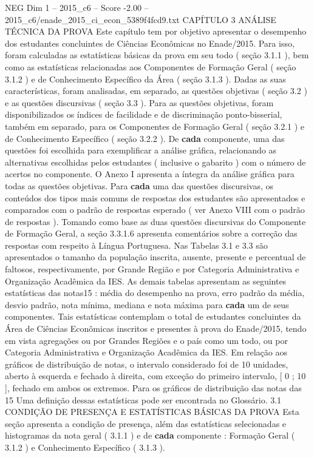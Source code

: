 \begin{textsample}{NEG Dim 1 – 2015\_c6 – Score -2.00 – 2015\_c6/enade\_2015\_ci\_econ\_5389f4fcd9.txt}  \label{ex:f1_neg_284}
CAPÍTULO 3 ANÁLISE TÉCNICA DA PROVA Este capítulo tem por objetivo apresentar o desempenho dos estudantes concluintes de Ciências Econômicas no Enade/2015.
Para isso, foram calculadas as estatísticas básicas da prova em seu todo ( seção 3.1.1 ), bem como as estatísticas relacionadas aos Componentes de Formação Geral ( seção 3.1.2 ) e de Conhecimento Específico da Área ( seção 3.1.3 ).
Dadas as suas características, foram analisadas, em separado, as questões objetivas ( seção 3.2 ) e as questões discursivas ( seção 3.3 ).
Para as questões objetivas, foram disponibilizados os índices de facilidade e de discriminação ponto-bisserial, também em separado, para os Componentes de Formação Geral ( seção 3.2.1 ) e de Conhecimento Específico ( seção 3.2.2 ).
De \textbf{cada} componente, uma das questões foi escolhida para exemplificar a análise gráfica, relacionando as alternativas escolhidas pelos estudantes ( inclusive o gabarito ) com o número de acertos no componente.
O Anexo I apresenta a íntegra da análise gráfica para todas as questões objetivas.
Para \textbf{cada} uma das questões discursivas, os conteúdos dos tipos mais comuns de respostas dos estudantes são apresentados e comparados com o padrão de respostas esperado ( ver Anexo VIII com o padrão de respostas ).
Tomando como base as duas questões discursivas do Componente de Formação Geral, a seção 3.3.1.6 apresenta comentários sobre a correção das respostas com respeito à Língua Portuguesa.
Nas Tabelas 3.1 e 3.3 são apresentados o tamanho da população inscrita, ausente, presente e percentual de faltosos, respectivamente, por Grande Região e por Categoria Administrativa e Organização Acadêmica da IES.
As demais tabelas apresentam as seguintes estatísticas das notas15 : média do desempenho na prova, erro padrão da média, desvio padrão, nota mínima, mediana e nota máxima para \textbf{cada} um de seus componentes.
Tais estatísticas contemplam o total de estudantes concluintes da Área de Ciências Econômicas inscritos e presentes à prova do Enade/2015, tendo em vista agregações ou por Grandes Regiões e o país como um todo, ou por Categoria Administrativa e Organização Acadêmica da IES.
Em relação aos gráficos de distribuição de notas, o intervalo considerado foi de 10 unidades, aberto à esquerda e fechado à direita, com exceção do primeiro intervalo, [ 0 ; 10 ], fechado em ambos os extremos.
Para os gráficos de distribuição das notas das 15 Uma definição dessas estatísticas pode ser encontrada no Glossário. 3.1 CONDIÇÃO DE PRESENÇA E ESTATÍSTICAS BÁSICAS DA PROVA Esta seção apresenta a condição de presença, além das estatísticas selecionadas e histogramas da nota geral ( 3.1.1 ) e de \textbf{cada} componente : Formação Geral ( 3.1.2 ) e Conhecimento Específico ( 3.1.3 ).

\end{textsample}
